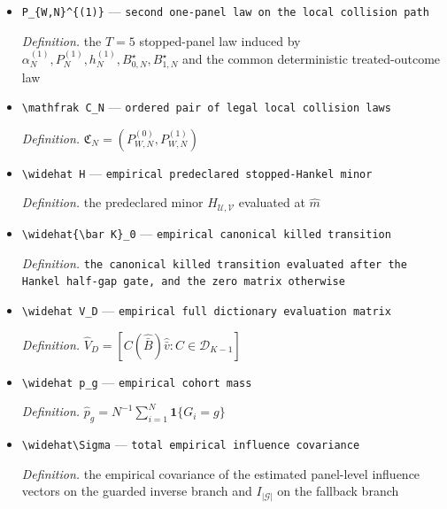 \documentclass{article}
\begin{document}
\begin{itemize}
  \par\smallskip\noindent\emph{Definition.} the \(T=5\) stopped-panel law induced by \(\alpha_{\star},P_{\star},h_N^{(0)},B_{0,N}^{\star},B_{1,N}^{\star}\) and the common deterministic treated-outcome law
  \item \texttt{P\_\allowbreak{}\{W,\allowbreak{}N\}\allowbreak{}\textasciicircum{}\{(1)\}\allowbreak{}} --- \texttt{second one-\allowbreak{}panel law on the local collision path}
  \par\smallskip\noindent\emph{Definition.} the \(T=5\) stopped-panel law induced by \(\alpha_N^{(1)},P_N^{(1)},h_N^{(1)},B_{0,N}^{\star},B_{1,N}^{\star}\) and the common deterministic treated-outcome law
  \item \texttt{\textbackslash{}\allowbreak{}mathfrak C\_\allowbreak{}N} --- \texttt{ordered pair of legal local collision laws}
  \par\smallskip\noindent\emph{Definition.} \(\mathfrak C_N=(P_{W,N}^{(0)},P_{W,N}^{(1)})\)
  \item \texttt{\textbackslash{}\allowbreak{}widehat H} --- \texttt{empirical predeclared stopped-\allowbreak{}Hankel minor}
  \par\smallskip\noindent\emph{Definition.} the predeclared minor \(H_{\mathcal U,\mathcal V}\) evaluated at \(\widehat m\)
  \item \texttt{\textbackslash{}\allowbreak{}widehat\{\textbackslash{}\allowbreak{}bar K\}\allowbreak{}\_\allowbreak{}0} --- \texttt{empirical canonical killed transition}
  \par\smallskip\noindent\emph{Definition.} \texttt{the canonical killed transition evaluated after the Hankel half-\allowbreak{}gap gate,\allowbreak{} and the zero matrix otherwise}
  \item \texttt{\textbackslash{}\allowbreak{}widehat V\_\allowbreak{}D} --- \texttt{empirical full dictionary evaluation matrix}
  \par\smallskip\noindent\emph{Definition.} \(\widehat V_D=[C(\widehat{\bar B})\widehat{\bar v}:C\in\mathcal D_{K-1}]\)
  \item \texttt{\textbackslash{}\allowbreak{}widehat p\_\allowbreak{}g} --- \texttt{empirical cohort mass}
  \par\smallskip\noindent\emph{Definition.} \(\widehat p_g=N^{-1}\sum_{i=1}^N\mathbf 1\{G_i=g\}\)
  \item \texttt{\textbackslash{}\allowbreak{}widehat\textbackslash{}\allowbreak{}Sigma} --- \texttt{total empirical influence covariance}
  \par\smallskip\noindent\emph{Definition.} the empirical covariance of the estimated panel-level influence vectors on the guarded inverse branch and \(I_{|\mathcal G|}\) on the fallback branch

\end{itemize}
\end{document}
